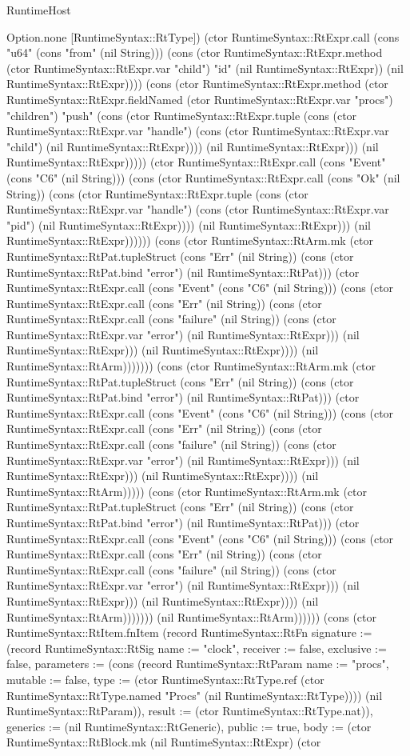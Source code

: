 \begin{lexlean}{RuntimeHost}
\begin{semanticmodule}
{Option.none [RuntimeSyntax::RtType]) (ctor RuntimeSyntax::RtExpr.call (cons "u64" (cons "from" (nil String))) (cons (ctor RuntimeSyntax::RtExpr.method (ctor RuntimeSyntax::RtExpr.var "child") "id" (nil RuntimeSyntax::RtExpr)) (nil RuntimeSyntax::RtExpr)))) (cons (ctor RuntimeSyntax::RtExpr.method (ctor RuntimeSyntax::RtExpr.fieldNamed (ctor RuntimeSyntax::RtExpr.var "procs") "children") "push" (cons (ctor RuntimeSyntax::RtExpr.tuple (cons (ctor RuntimeSyntax::RtExpr.var "handle") (cons (ctor RuntimeSyntax::RtExpr.var "child") (nil RuntimeSyntax::RtExpr)))) (nil RuntimeSyntax::RtExpr))) (nil RuntimeSyntax::RtExpr))))) (ctor RuntimeSyntax::RtExpr.call (cons "Event" (cons "C6" (nil String))) (cons (ctor RuntimeSyntax::RtExpr.call (cons "Ok" (nil String)) (cons (ctor RuntimeSyntax::RtExpr.tuple (cons (ctor RuntimeSyntax::RtExpr.var "handle") (cons (ctor RuntimeSyntax::RtExpr.var "pid") (nil RuntimeSyntax::RtExpr)))) (nil RuntimeSyntax::RtExpr))) (nil RuntimeSyntax::RtExpr)))))) (cons (ctor RuntimeSyntax::RtArm.mk (ctor RuntimeSyntax::RtPat.tupleStruct (cons "Err" (nil String)) (cons (ctor RuntimeSyntax::RtPat.bind "error") (nil RuntimeSyntax::RtPat))) (ctor RuntimeSyntax::RtExpr.call (cons "Event" (cons "C6" (nil String))) (cons (ctor RuntimeSyntax::RtExpr.call (cons "Err" (nil String)) (cons (ctor RuntimeSyntax::RtExpr.call (cons "failure" (nil String)) (cons (ctor RuntimeSyntax::RtExpr.var "error") (nil RuntimeSyntax::RtExpr))) (nil RuntimeSyntax::RtExpr))) (nil RuntimeSyntax::RtExpr)))) (nil RuntimeSyntax::RtArm))))))) (cons (ctor RuntimeSyntax::RtArm.mk (ctor RuntimeSyntax::RtPat.tupleStruct (cons "Err" (nil String)) (cons (ctor RuntimeSyntax::RtPat.bind "error") (nil RuntimeSyntax::RtPat))) (ctor RuntimeSyntax::RtExpr.call (cons "Event" (cons "C6" (nil String))) (cons (ctor RuntimeSyntax::RtExpr.call (cons "Err" (nil String)) (cons (ctor RuntimeSyntax::RtExpr.call (cons "failure" (nil String)) (cons (ctor RuntimeSyntax::RtExpr.var "error") (nil RuntimeSyntax::RtExpr))) (nil RuntimeSyntax::RtExpr))) (nil RuntimeSyntax::RtExpr)))) (nil RuntimeSyntax::RtArm))))) (cons (ctor RuntimeSyntax::RtArm.mk (ctor RuntimeSyntax::RtPat.tupleStruct (cons "Err" (nil String)) (cons (ctor RuntimeSyntax::RtPat.bind "error") (nil RuntimeSyntax::RtPat))) (ctor RuntimeSyntax::RtExpr.call (cons "Event" (cons "C6" (nil String))) (cons (ctor RuntimeSyntax::RtExpr.call (cons "Err" (nil String)) (cons (ctor RuntimeSyntax::RtExpr.call (cons "failure" (nil String)) (cons (ctor RuntimeSyntax::RtExpr.var "error") (nil RuntimeSyntax::RtExpr))) (nil RuntimeSyntax::RtExpr))) (nil RuntimeSyntax::RtExpr)))) (nil RuntimeSyntax::RtArm))))))) (nil RuntimeSyntax::RtArm))))})) (cons (ctor RuntimeSyntax::RtItem.fnItem (record RuntimeSyntax::RtFn {signature := (record RuntimeSyntax::RtSig {name := "clock", receiver := false, exclusive := false, parameters := (cons (record RuntimeSyntax::RtParam {name := "procs", mutable := false, type := (ctor RuntimeSyntax::RtType.ref (ctor RuntimeSyntax::RtType.named "Procs" (nil RuntimeSyntax::RtType)))}) (nil RuntimeSyntax::RtParam)), result := (ctor RuntimeSyntax::RtType.nat)}), generics := (nil RuntimeSyntax::RtGeneric), public := true, body := (ctor RuntimeSyntax::RtBlock.mk (nil RuntimeSyntax::RtExpr) (ctor }
\end{semanticmodule}
\end{lexlean}
